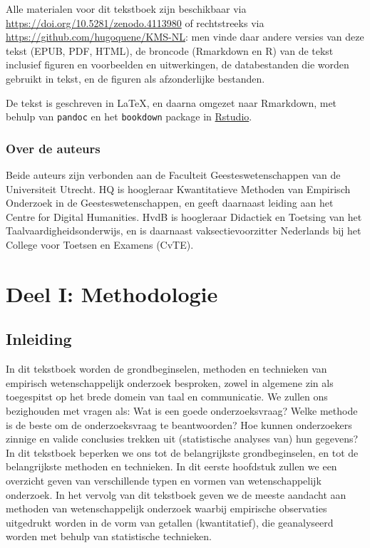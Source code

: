\documentclass[
]{book}
\begin{document}
Alle materialen voor dit tekstboek zijn beschikbaar via \url{https://doi.org/10.5281/zenodo.4113980} of rechtstreeks via \url{https://github.com/hugoquene/KMS-NL}: men vinde daar andere versies van deze tekst (EPUB, PDF, HTML), de broncode (Rmarkdown en R) van de tekst inclusief figuren en voorbeelden en uitwerkingen, de databestanden die worden gebruikt in tekst, en de figuren als afzonderlijke bestanden.

De tekst is geschreven in LaTeX, en daarna omgezet naar Rmarkdown, met behulp van \texttt{pandoc} \citep{pandoc} en het \texttt{bookdown} package \citep{R-bookdown} in \href{https://www.rstudio.com}{Rstudio}.\\

\hypertarget{over-de-auteurs}{%
\section*{Over de auteurs}\label{over-de-auteurs}}

Beide auteurs zijn verbonden aan de Faculteit Geesteswetenschappen van de Universiteit Utrecht. HQ is hoogleraar Kwantitatieve Methoden van Empirisch Onderzoek in de Geesteswetenschappen, en geeft daarnaast leiding aan het Centre for Digital Humanities. HvdB is hoogleraar Didactiek en Toetsing van het Taalvaardigheidsonderwijs, en is daarnaast vaksectievoorzitter Nederlands bij het College voor Toetsen en Examens (CvTE).

\hypertarget{part-deel-i-methodologie}{%
\part*{Deel I: Methodologie}\label{part-deel-i-methodologie}}

\hypertarget{ch:inleiding}{%
\chapter{Inleiding}\label{ch:inleiding}}

In dit tekstboek worden de grondbeginselen, methoden en technieken van
empirisch wetenschappelijk onderzoek besproken, zowel in algemene zin
als toegespitst op het brede domein van taal en communicatie. We zullen ons bezighouden met vragen als: Wat is een goede onderzoeksvraag? Welke methode is de beste om de onderzoeksvraag te beantwoorden? Hoe kunnen onderzoekers zinnige en valide conclusies trekken uit (statistische analyses van) hun gegevens? In dit tekstboek beperken we ons tot de belangrijkste grondbeginselen, en tot de belangrijkste methoden en technieken. In dit eerste hoofdstuk zullen we een overzicht geven van verschillende typen en vormen van wetenschappelijk onderzoek. In het vervolg van dit tekstboek geven we de meeste aandacht aan methoden van wetenschappelijk onderzoek waarbij empirische observaties uitgedrukt worden in de vorm van getallen (kwantitatief), die geanalyseerd worden met behulp van statistische technieken.
\end{document}
